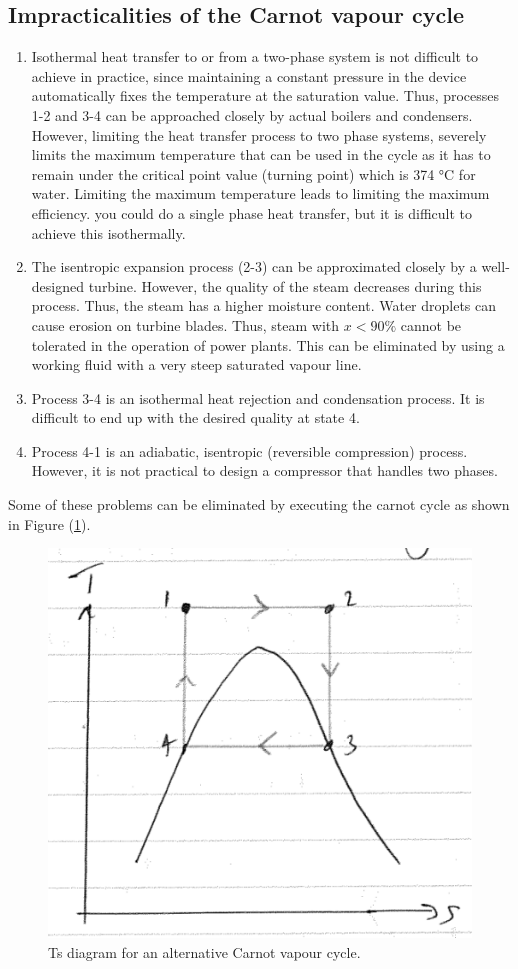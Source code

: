 \documentclass[class=report, crop=false, 12pt,a4paper]{standalone}
\begin{document}
\subsection{Impracticalities of the Carnot vapour cycle}
\begin{enumerate}[noitemsep]
  \item Isothermal heat transfer to or from a two-phase system is not difficult to achieve in practice, since maintaining a constant pressure in the device automatically fixes the temperature at the saturation value. Thus, processes 1-2 and 3-4 can be approached closely by actual boilers and condensers. However, limiting the heat transfer process to two phase systems, severely limits the maximum temperature that can be used in the cycle as it has to remain under the critical point value (turning point) which is 374 \si{\celsius} for water. Limiting the maximum temperature leads to limiting the maximum efficiency. you could do a single phase heat transfer, but it is difficult to achieve this isothermally. 
  \item The isentropic expansion process (2-3) can be approximated closely by a well-designed turbine. However, the quality of the steam decreases during this process. Thus, the steam has a higher moisture content. Water droplets can cause erosion on turbine blades. Thus, steam with $x<90\% $ cannot be tolerated in the operation of power plants. This can be eliminated by using a working fluid with a very steep saturated vapour line.
  \item Process 3-4 is an isothermal heat rejection and condensation process. It is difficult to end up with the desired quality at state 4.
  \item Process 4-1 is an adiabatic, isentropic (reversible compression) process. However, it is not practical to design a compressor that handles two phases.
\end{enumerate}
Some of these problems can be eliminated by executing the carnot cycle as shown in Figure (\ref{BetterCarnot}).
\begin{figure}
  \centering
  \includegraphics[width = 0.6 \textwidth]{../img/BetterCarnotTS}
  \caption{Ts diagram for an alternative Carnot vapour cycle.}
  \label{BetterCarnot}
\end{figure}
\end{document}
